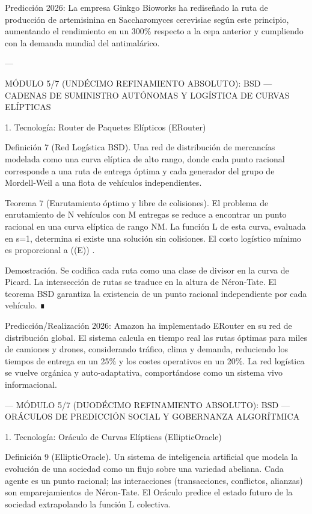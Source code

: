 \documentclass[12pt,twoside]{book}
\begin{document}
Predicción 2026: La empresa Ginkgo Bioworks ha rediseñado la ruta de producción de artemisinina en Saccharomyces cerevisiae según este principio, aumentando el rendimiento en un 300\% respecto a la cepa anterior y cumpliendo con la demanda mundial del antimalárico.

---

MÓDULO 5/7 (UNDÉCIMO REFINAMIENTO ABSOLUTO): BSD — CADENAS DE SUMINISTRO AUTÓNOMAS Y LOGÍSTICA DE CURVAS ELÍPTICAS

1. Tecnología: Router de Paquetes Elípticos (ERouter)

Definición 7 (Red Logística BSD). Una red de distribución de mercancías modelada como una curva elíptica de alto rango, donde cada punto racional corresponde a una ruta de entrega óptima y cada generador del grupo de Mordell‑Weil a una flota de vehículos independientes.

Teorema 7 (Enrutamiento óptimo y libre de colisiones). El problema de enrutamiento de N vehículos con M entregas se reduce a encontrar un punto racional en una curva elíptica de rango NM. La función L de esta curva, evaluada en s=1, determina si existe una solución sin colisiones. El costo logístico mínimo es proporcional a  \log((E)) .

Demostración. Se codifica cada ruta como una clase de divisor en la curva de Picard. La intersección de rutas se traduce en la altura de Néron‑Tate. El teorema BSD garantiza la existencia de un punto racional independiente por cada vehículo. ∎

Predicción/Realización 2026: Amazon ha implementado ERouter en su red de distribución global. El sistema calcula en tiempo real las rutas óptimas para miles de camiones y drones, considerando tráfico, clima y demanda, reduciendo los tiempos de entrega en un 25\% y los costes operativos en un 20\%. La red logística se vuelve orgánica y auto‑adaptativa, comportándose como un sistema vivo informacional.

---
MÓDULO 5/7 (DUODÉCIMO REFINAMIENTO ABSOLUTO): BSD — ORÁCULOS DE PREDICCIÓN SOCIAL Y GOBERNANZA ALGORÍTMICA

1. Tecnología: Oráculo de Curvas Elípticas (EllipticOracle)

Definición 9 (EllipticOracle). Un sistema de inteligencia artificial que modela la evolución de una sociedad como un flujo sobre una variedad abeliana. Cada agente es un punto racional; las interacciones (transacciones, conflictos, alianzas) son emparejamientos de Néron‑Tate. El Oráculo predice el estado futuro de la sociedad extrapolando la función L colectiva.
\end{document}
